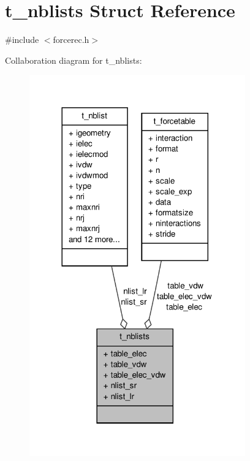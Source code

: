 \hypertarget{structt__nblists}{\section{t\-\_\-nblists \-Struct \-Reference}
\label{structt__nblists}
}


{\ttfamily \#include $<$forcerec.\-h$>$}



\-Collaboration diagram for t\-\_\-nblists\-:
\nopagebreak
\begin{figure}[H]
\begin{center}
\leavevmode
\includegraphics[width=264pt]{structt__nblists__coll__graph}
\end{center}
\end{figure}
